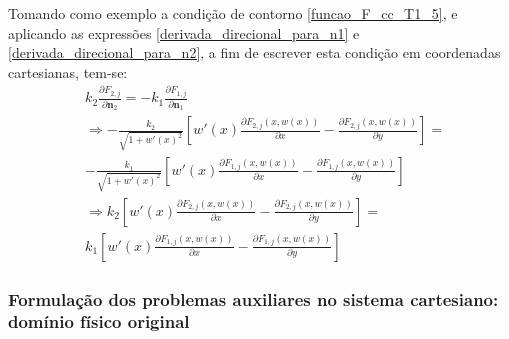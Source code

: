 Tomando como exemplo a condição de contorno \eqref{funcao_F_cc_T1_5}, e aplicando as expressões \eqref{derivada_direcional_para_n1} e \eqref{derivada_direcional_para_n2},
a fim de escrever esta condição em coordenadas cartesianas,
tem-se:
\begin{align}
& k_2\frac{\partial F_{2, j}}{\partial\mathbf{n}_2} = - k_1\frac{\partial F_{1,j}}{\partial\mathbf{n}_1} \nonumber \\
& \Rightarrow -\frac{k_2}{\sqrt{1 + w'(x)^2}}\left[w'(x)\frac{\partial F_{2,j}(x, w(x))}{\partial x} - \frac{\partial F_{2,j}(x, w(x))}{\partial y}\right] = \nonumber \\
& -\frac{k_1}{\sqrt{1 + w'(x)^2}}\left[w'(x)\frac{\partial F_{1,j}(x, w(x))}{\partial x} - \frac{\partial F_{1,j}(x, w(x))}{\partial y}\right] \nonumber \\
& \Rightarrow k_2\left[w'(x)\frac{\partial F_{2,j}(x, w(x))}{\partial x} - \frac{\partial F_{2,j}(x, w(x))}{\partial y}\right] = \nonumber \\
& k_1 \left[w'(x)\frac{\partial F_{1,j}(x, w(x))}{\partial x} - \frac{\partial F_{1,j}(x, w(x))}{\partial y}\right]
\end{align}

\subsubsection{Formulação dos problemas auxiliares no sistema cartesiano: domínio físico original}

